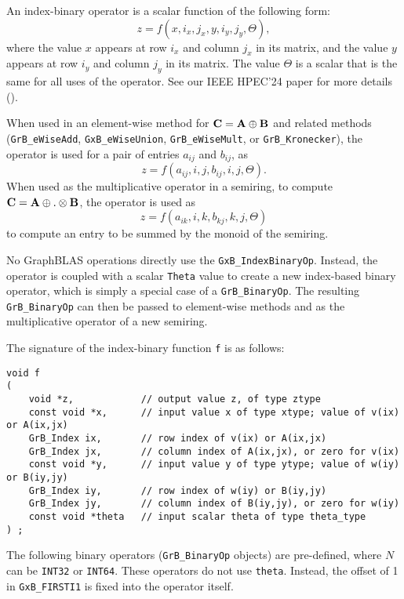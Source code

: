 \documentclass[12pt]{article}
\begin{document}
An index-binary operator is a scalar function of the following form:
\[
z=f(x,i_x,j_x,y,i_y,j_y,\Theta),
\]
where the value $x$ appears at row $i_x$ and column $j_x$ in its matrix,
and the value $y$ appears at row $i_y$ and column $j_y$ in its matrix.
The value $\Theta$ is a scalar that is the same for all uses of the operator.
See our IEEE HPEC'24 paper for more details (\cite{idxbinop}).

When used in an element-wise method for $\bf C = A \oplus B$ and related
methods (\verb'GrB_eWiseAdd', \verb'GxB_eWiseUnion', \verb'GrB_eWiseMult', or
\verb'GrB_Kronecker'), the operator is used for a pair of entries $a_{ij}$ and
$b_{ij}$, as
\[
z=f(a_{ij},i,j,b_{ij},i,j,\Theta).
\]
When used as the multiplicative operator in a semiring, to compute
$\bf C = A \oplus.\otimes B$, the operator is used as
\[
z=f(a_{ik},i,k,b_{kj},k,j,\Theta)
\]
to compute an entry to be summed by the monoid of the semiring.

No GraphBLAS operations directly use the \verb'GxB_IndexBinaryOp'.  Instead,
the operator is coupled with a scalar \verb'Theta' value to create a new
index-based binary operator, which is simply a special case of a
\verb'GrB_BinaryOp'.  The resulting \verb'GrB_BinaryOp' can then be passed to
element-wise methods and as the multiplicative operator of a new semiring.

The signature of the index-binary function \verb'f' is as follows:

{\footnotesize
\begin{verbatim}
void f
(
    void *z,            // output value z, of type ztype
    const void *x,      // input value x of type xtype; value of v(ix) or A(ix,jx)
    GrB_Index ix,       // row index of v(ix) or A(ix,jx)
    GrB_Index jx,       // column index of A(ix,jx), or zero for v(ix)
    const void *y,      // input value y of type ytype; value of w(iy) or B(iy,jy)
    GrB_Index iy,       // row index of w(iy) or B(iy,jy)
    GrB_Index jy,       // column index of B(iy,jy), or zero for w(iy)
    const void *theta   // input scalar theta of type theta_type
) ; \end{verbatim}}

The following binary operators (\verb'GrB_BinaryOp' objects) are pre-defined,
where $N$ can be \verb'INT32' or \verb'INT64'.  These operators do not use
\verb'theta'.  Instead, the offset of 1 in \verb'GxB_FIRSTI1' is fixed into
the operator itself.
\end{document}
